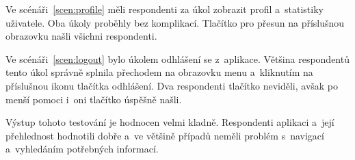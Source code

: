 Ve scénáři~\ref{scen:profile} měli respondenti za úkol zobrazit profil
a~statistiky uživatele.
Oba úkoly proběhly bez komplikací.
Tlačítko pro přesun na příslušnou obrazovku našli všichni respondenti.

Ve scénáři~\ref{scen:logout} bylo úkolem odhlášení se z~aplikace.
Většina respondentů tento úkol správně splnila přechodem na obrazovku menu
a~kliknutím na příslušnou ikonu tlačítka odhlášení.
Dva respondenti tlačítko neviděli,
avšak po menší pomoci i~oni tlačítko úspěšně našli.

Výstup tohoto testování je hodnocen velmi kladně.
Respondenti aplikaci a~její přehlednost hodnotili dobře a~ve většině případů
neměli problém s~navigací a~vyhledáním potřebných informací.